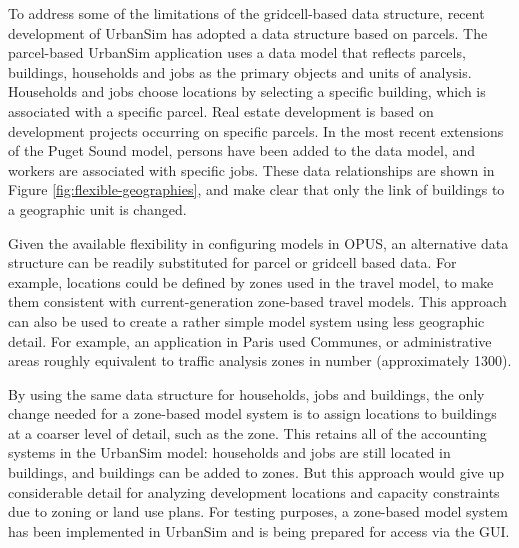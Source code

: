 To address some of the limitations of the gridcell-based data structure, recent development of UrbanSim has adopted a data structure based on parcels.
The parcel-based UrbanSim application uses a data model that reflects parcels, buildings, households and jobs as the
primary objects and units of analysis.  Households and jobs
choose locations by selecting a specific building, which is associated with a specific parcel.
Real estate development is based on development projects occurring on specific parcels.  In the most recent extensions of the Puget Sound model,
persons have been added to the data model, and workers are associated with specific jobs.  These data relationships
are shown in Figure \ref{fig:flexible-geographies}, and make clear that only the link of buildings to a geographic unit is changed.



Given the available flexibility in configuring models in OPUS, an alternative data structure can be readily substituted for parcel or gridcell based data.  For example, locations could be defined by zones used in the travel model, to make them consistent with current-generation zone-based travel models.  This approach can also be used to create a rather simple model system using less geographic detail.  For example, an application in Paris used Communes, or administrative areas roughly equivalent to traffic analysis zones in number (approximately 1300).

By using the same data structure for households, jobs and buildings, the only change needed for a zone-based model system is to assign locations to buildings at a coarser level of detail, such as the zone.  This retains all of the accounting systems in the UrbanSim model: households and jobs are still located in buildings, and buildings can be added to zones.  But this approach would give up considerable detail for analyzing development locations and capacity constraints due to zoning or land use plans. For testing purposes, a zone-based model system has been implemented in UrbanSim and is being prepared for access via the GUI.

